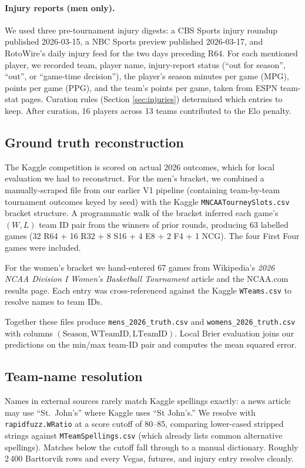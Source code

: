\documentclass[11pt, a4paper]{article}
\begin{document}
\paragraph{Injury reports (men only).}
We used three pre-tournament injury digests: a CBS Sports injury roundup published 2026-03-15, a NBC Sports preview published 2026-03-17, and RotoWire's daily injury feed for the two days preceding R64. For each mentioned player, we recorded team, player name, injury-report status (``out for season'', ``out'', or ``game-time decision''), the player's season minutes per game (MPG), points per game (PPG), and the team's points per game, taken from ESPN team-stat pages. Curation rules (Section \ref{sec:injuries}) determined which entries to keep. After curation, 16 players across 13 teams contributed to the Elo penalty.

\subsection{Ground truth reconstruction}
\label{sec:truth}

The Kaggle competition is scored on actual 2026 outcomes, which for local evaluation we had to reconstruct. For the men's bracket, we combined a manually-scraped file from our earlier V1 pipeline (containing team-by-team tournament outcomes keyed by seed) with the Kaggle \texttt{MNCAATourneySlots.csv} bracket structure. A programmatic walk of the bracket inferred each game's $(W, L)$ team ID pair from the winners of prior rounds, producing 63 labelled games (32 R64 + 16 R32 + 8 S16 + 4 E8 + 2 F4 + 1 NCG). The four First Four games were included.

For the women's bracket we hand-entered 67 games from Wikipedia's \emph{2026 NCAA Division I Women's Basketball Tournament} article and the NCAA.com results page. Each entry was cross-referenced against the Kaggle \texttt{WTeams.csv} to resolve names to team IDs.

Together these files produce \texttt{mens\_2026\_truth.csv} and \texttt{womens\_2026\_truth.csv} with columns $(\text{Season}, \text{WTeamID}, \text{LTeamID})$. Local Brier evaluation joins our predictions on the min/max team-ID pair and computes the mean squared error.

\subsection{Team-name resolution}
\label{sec:team-name}
Names in external sources rarely match Kaggle spellings exactly: a news article may use ``St.\ John's'' where Kaggle uses ``St John's.'' We resolve with \texttt{rapidfuzz.WRatio} at a score cutoff of 80--85, comparing lower-cased stripped strings against \texttt{MTeamSpellings.csv} (which already lists common alternative spellings). Matches below the cutoff fall through to a manual dictionary. Roughly 2\,400 Barttorvik rows and every Vegas, futures, and injury entry resolve cleanly.
\end{document}
